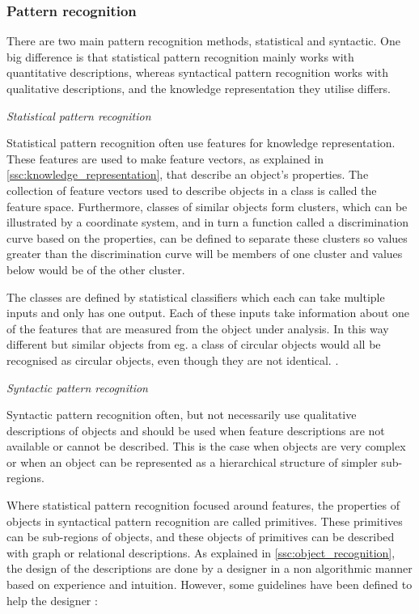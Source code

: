 \subsubsection{Pattern recognition}\label{ssc:pat_recogn}
There are two main pattern recognition methods, statistical and syntactic. One big difference is that statistical pattern recognition mainly works with quantitative descriptions, whereas syntactical pattern recognition works with qualitative descriptions, and the knowledge representation they utilise differs.

\emph{Statistical pattern recognition}

Statistical pattern recognition often use features for knowledge representation. These features are used to make feature vectors, as explained in \cref{ssc:knowledge_representation}, that describe an object's properties. The collection of feature vectors used to describe objects in a class is called the feature space. Furthermore, classes of similar objects form clusters, which can be illustrated by a coordinate system, and in turn a function called a discrimination curve based on the properties, can be defined to separate these clusters so values greater than the discrimination curve will be members of one cluster and values below would be of the other cluster.

The classes are defined by statistical classifiers which each can take multiple inputs and only has one output. Each of these inputs take information about one of the features that are measured from the object under analysis. In this way different but similar objects from eg. a class of circular objects would all be recognised as circular objects, even though they are not identical.  \citep[Pages 387-404]{obj_recogn_book}.

\emph{Syntactic pattern recognition}

Syntactic pattern recognition often, but not necessarily use qualitative descriptions of objects and should be used when feature descriptions are not available or cannot be described. This is the case when objects are very complex or when an object can be represented as a hierarchical structure of simpler sub-regions.

Where statistical pattern recognition focused around features, the properties of objects in syntactical pattern recognition are called primitives. These primitives can be sub-regions of objects, and these objects of primitives can be described with graph or relational descriptions.
As explained in \cref{ssc:object_recognition}, the design of the descriptions are done by a designer in a non algorithmic manner based on experience and intuition. However, some guidelines have been defined to help the designer \citep[Page 410]{obj_recogn_book}:

